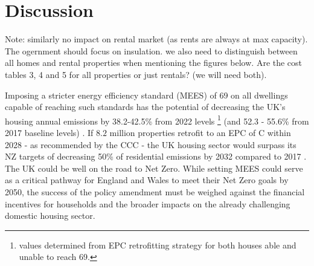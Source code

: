 \section{Discussion}

Note: similarly no impact on rental market (as rents are always at max capacity). The ogernment should focus on insulation. we also need to distinguish between all homes and rental properties when mentioning the figures below. Are the cost tables 3, 4 and 5 for all properties or just rentals? (we will need both).


Imposing a stricter energy efficiency standard (MEES) of 69 on all dwellings capable of reaching such standards has the potential of decreasing the UK's housing annual emissions by 38.2-42.5\% from 2022 levels \footnote{values determined from EPC retrofitting strategy for both houses able and unable to reach 69.} (and 52.3 - 55.6\% from 2017 baseline levels) \cite{department_for_business_energy_and_industrial_strategy_english_2023, department_for_business_energy_and_industrial_strategy_household_2020, office_for_national_statistics_energy_2023}.  If $8.2$ million properties retrofit to an EPC of C within 2028 - as recommended by the CCC \cite{climate_change_committee_ccc_2022_2022} - the UK housing sector would surpass its NZ targets of decreasing 50\%  of  residential emissions by 2032 compared to 2017 \cite{department_for_business_energy_and_industrial_strategy_english_2023}. The UK could be well on the road to Net Zero. While setting MEES could serve as a critical pathway for England and Wales to meet their Net Zero goals by 2050, the success of the policy amendment must be weighed against the financial incentives for households and the broader impacts on the already challenging domestic housing sector. \\

